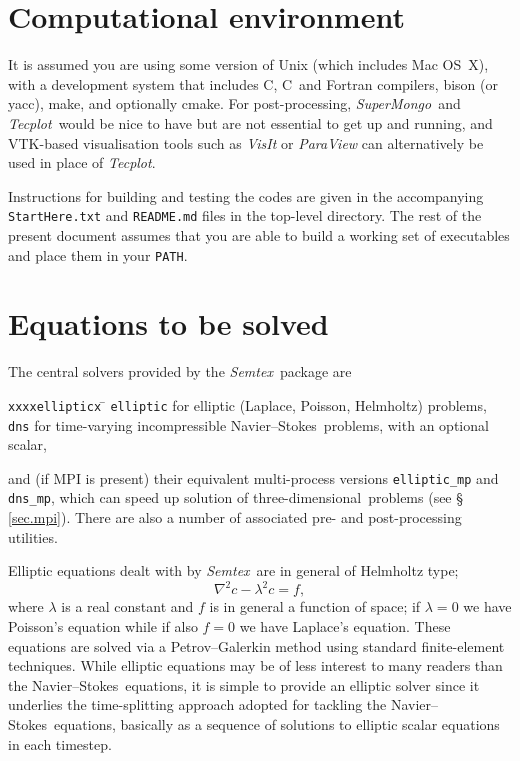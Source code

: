 \documentclass[11pt]{report}
\newcommand{\Semtex}{\emph{Semtex}} \newcommand{\Dog}{\emph{Dog}}
\newcommand{\SM}{\emph{SuperMongo}}
\newcommand{\Tecplot}{\emph{Tecplot}}
\newcommand\threed{three-di\-men\-sion\-al}
\newcommand\NavSto{Navier--Stokes}
\newcommand\cpp{C\nolinebreak\hspace{-.05em}\raisebox{.3ex}{\footnotesize\bf
+}\nolinebreak\hspace{-.10em}\raisebox{.3ex}{\footnotesize\bf+}}
\begin{document}
\section{Computational environment}

It is assumed you are using some version of Unix (which includes Mac
OS~X), with a development system that includes C, \cpp\ and Fortran
compilers, bison (or yacc), make, and optionally cmake. For
post-processing, \SM\ and \Tecplot\ would be nice to have but are
not essential to get up and running, and VTK-based visualisation tools
such as \emph{VisIt} or \emph{ParaView} can alternatively be used in
place of \Tecplot.

Instructions for building and testing the codes are given in the
accompanying \texttt{StartHere.txt} and \texttt{README.md} files in
the top-level directory.  The rest of the present document assumes
that you are able to build a working set of executables and place them
in your \texttt{PATH}.

\section{Equations to be solved}
\label{sec.pdes}

The central solvers provided by the \Semtex\ package are
\begin{tabbing}
\texttt{xxxxellipticx} \= \kill
\hspace*{4ex}\texttt{elliptic} \> for elliptic (Laplace, Poisson, Helmholtz)
problems,\\
\hspace*{4ex}\texttt{dns} \> for time-varying incompressible
\NavSto\ problems, with an optional scalar,
\end{tabbing}
and (if MPI is present) their equivalent multi-process versions
\texttt{elliptic\_mp} and \texttt{dns\_mp}, which can speed up
solution of \threed\ problems (see \S\,\ref{sec.mpi}).  There are also
a number of associated pre- and post-processing utilities.

Elliptic equations dealt with by \Semtex\ are in general of Helmholtz
type;
\begin{equation}
  \nabla^2 c - \lambda^2 c = f,
  \label{eq.elliptic}
\end{equation}
where $\lambda$ is a real constant and $f$ is in general a function of
space; if $\lambda=0$ we have Poisson's equation while if also $f=0$
we have Laplace's equation.  These equations are solved via a
Petrov--Galerkin method using standard finite-element techniques.
While elliptic equations may be of less interest to many readers than
the \NavSto\ equations, it is simple to provide an elliptic solver
since it underlies the time-splitting approach adopted for tackling
the \NavSto\ equations, \ie basically as a sequence of solutions to
elliptic scalar equations in each timestep.
\end{document}
